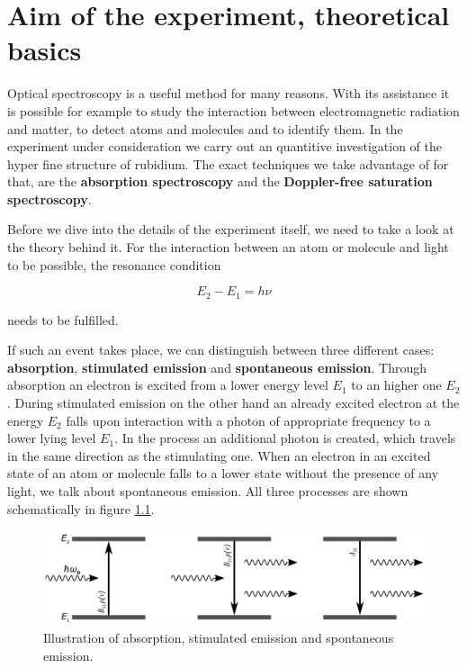 \chapter{Aim of the experiment, theoretical basics}
Optical spectroscopy is a useful method for many reasons. With its assistance it is possible for example to study the interaction between electromagnetic radiation and matter, to detect atoms and molecules and to identify them. In the experiment under consideration we carry out an quantitive investigation of the hyper fine structure of rubidium. The exact techniques we take advantage of for that, are the \textbf{absorption spectroscopy} and the \textbf{Doppler-free saturation spectroscopy}.

Before we dive into the details of the experiment itself, we need to take a look at the theory behind it. For the interaction between an atom or molecule and light to be possible, the resonance condition

\begin{equation}
\label{E:Res. con.}
E_2-E_1=h\nu
\end{equation}

\noindent
needs to be fulfilled. 

If such an event takes place, we can distinguish between three different cases: \textbf{absorption}, \textbf{stimulated emission} and \textbf{spontaneous emission}. Through absorption an electron is excited from a lower energy level $E_1$ to an higher one $E_2$. During stimulated emission on the other hand an already excited electron at the energy $E_2$ falls upon interaction with a photon of appropriate frequency to a lower lying level $E_1$. In the process an additional photon is created, which travels in the same direction as the stimulating one. When an electron in an excited state of an atom or molecule falls to a lower state without the presence of any light, we talk about spontaneous emission. All three processes are shown schematically in figure \ref{fig:Emisabs.}.

\begin{figure}[h]
    \centering
    \includegraphics[width=15.8cm]{Emisabs.png}
    \caption{Illustration of absorption, stimulated emission and spontaneous emission.}
    \label{fig:Emisabs.}
\end{figure}

